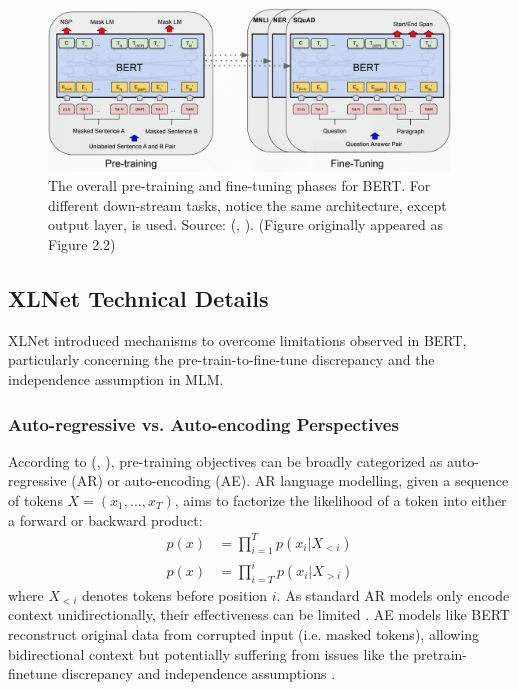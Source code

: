 \documentclass[10pt,oneside]{report}
\renewcommand{\citet}[1]{\citeauthor{#1}, \citeyear{#1}}
\begin{document}
\begin{figure}[htbp]
    \centering
    \includegraphics[width=0.95\textwidth]{BERT1.png} 
    \caption[BERT Pre-training and Fine-tuning Phases (Appendix)]{The overall pre-training and fine-tuning phases for BERT. For different down-stream tasks, notice the same architecture, except output layer, is used. Source: (\citet{devlin2019bert}). (Figure originally appeared as Figure 2.2)}
    \label{fig:bert1_appendix} 
\end{figure}

\subsection{XLNet Technical Details}\label{app:xlnet_maths}

XLNet \cite{yang2019xlnet} introduced mechanisms to overcome limitations observed in BERT, particularly concerning the pre-train-to-fine-tune discrepancy and the independence assumption in MLM.

\subsubsection*{Auto-regressive vs. Auto-encoding Perspectives}
According to (\citet{yang2019xlnet}), pre-training objectives can be broadly categorized as auto-regressive (AR) or auto-encoding (AE). AR language modelling, given a sequence of tokens $X = (x_1, ..., x_T)$, aims to factorize the likelihood of a token into either a forward or backward product:
\begin{align}
    p(x) &= \prod_{i=1}^{T} p(x_i | X_{<i}) \label{eq:fwdprod_appendix} \\
    p(x) &= \prod_{i=T}^{i} p(x_i | X_{>i}) \label{eq:bckprod_appendix}
\end{align}
where $X_{<i}$ denotes tokens before position $i$. As standard AR models only encode context unidirectionally, their effectiveness can be limited \cite{yang2019xlnet}. AE models like BERT reconstruct original data from corrupted input (i.e. masked tokens), allowing bidirectional context but potentially suffering from issues like the pretrain-finetune discrepancy and independence assumptions \cite{yang2019xlnet}.
\end{document}

